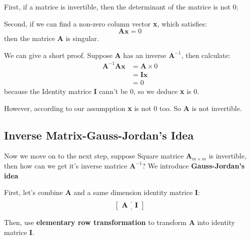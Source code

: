         First, if a matrice is invertible, then the determinant of the matrice is not 0;

        Second, if we can find a non-zero column vector \textbf{x}, which satisfies:
            \begin{equation}
                \mathbf{A} \mathbf{x} = 0
            \end{equation}
        then the matrice \textbf{A} is singular.

        We can give a short proof. Suppose \textbf{A} has an inverse $\mathbf{A}^{-1}$, 
        then calculate:
            \begin{equation}
                \begin{aligned}
                \mathbf{A}^{-1} \mathbf{A} \mathbf{x} &= \mathbf{A} \times 0\\
                &= \mathbf{I} \mathbf{x} \\
                &= 0
                \end{aligned}
            \end{equation}
        because the Identity matrice \textbf{I} cann't be 0, so we deduce \textbf{x} is 0.
        
        However, according to our assumpption \textbf{x} is not 0 too.
        So \textbf{A} is not invertible.

    \subsection{Inverse Matrix-Gauss-Jordan's Idea}
        Now we move on to the next step, suppose Square matrice $\mathbf{A}_{m\times m}$ is invertible,
        then how can we get it's inverse matrice $\mathbf{A}^{-1}$?
        We introduce \textbf{Gauss-Jordan's idea}

        First, let's combine \textbf{A} and a same dimension identity matrice \textbf{I}:
            \begin{equation}
                \left[
                    \begin{array}{c:c}
                        \mathbf{A} & \mathbf{I}
                    \end{array}
                \right]    
            \end{equation}
        
        Then, use \textbf{elementary row transformation} to transform \textbf{A} into identity matrice \textbf{I}.
        
